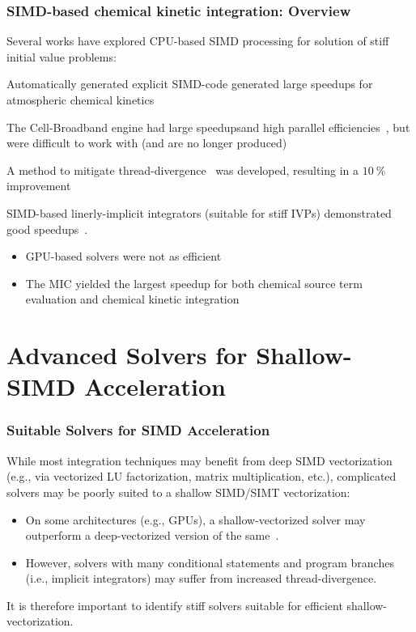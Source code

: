 \documentclass{beamer}
\newcounter{stiff}
\begin{document}
\begin{frame}
\frametitle{SIMD-based chemical kinetic integration: Overview}
Several works have explored CPU-based SIMD processing for solution of stiff initial value problems:
\begin{itemize}
 \item Automatically generated explicit SIMD-code generated large speedups for atmospheric chemical kinetics~~
 \item The Cell-Broadband engine had large speedups\footnotemark[\value{footnote}] and high parallel efficiencies~, but were difficult to work with (and are no longer produced)
 \item A method to mitigate thread-divergence~ was developed, resulting in a $\SI{10}{\percent}$ improvement
 {
 \item SIMD-based linerly-implicit integrators (suitable for stiff IVPs) demonstrated good speedups~.
 \begin{itemize}
  \item GPU-based solvers were not as efficient
  \item The MIC yielded the largest speedup for both chemical source term evaluation and chemical kinetic integration
 \end{itemize}
 }
\end{itemize}
\end{frame}


\section{Advanced Solvers for Shallow-SIMD Acceleration}
\begin{frame}
\frametitle{Suitable Solvers for SIMD Acceleration}
 While most integration techniques may benefit from deep SIMD vectorization (e.g., via vectorized LU factorization, matrix multiplication, etc.), complicated solvers may be poorly suited to a shallow SIMD\slash SIMT vectorization:
 \begin{itemize}
  \item On some architectures (e.g., GPUs), a shallow-vectorized solver may outperform a deep-vectorized version of the same~.
  \item However, solvers with many conditional statements and program branches (i.e., implicit integrators) may suffer from increased thread-divergence\footnotemark[\value{footnote}].
 \end{itemize}
 It is therefore important to identify stiff solvers suitable for efficient shallow-vectorization.
\end{frame}
\end{document}
